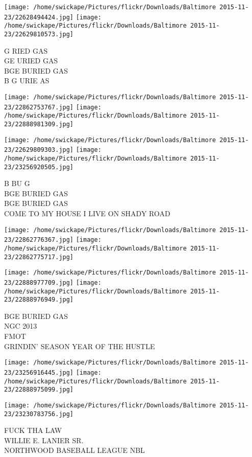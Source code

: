 \documentclass[10pt,letterpaper]{article}
\begin{document}
\texttt{[image: /home/swickape/Pictures/flickr/Downloads/Baltimore 2015-11-23/22628494424.jpg]}
\texttt{[image: /home/swickape/Pictures/flickr/Downloads/Baltimore 2015-11-23/22629810573.jpg]}

G RIED GAS\\
GE URIED GAS\\
BGE BURIED GAS\\
B G URIE AS
\pagebreak

\texttt{[image: /home/swickape/Pictures/flickr/Downloads/Baltimore 2015-11-23/22862753767.jpg]}
\texttt{[image: /home/swickape/Pictures/flickr/Downloads/Baltimore 2015-11-23/22888981309.jpg]}

\texttt{[image: /home/swickape/Pictures/flickr/Downloads/Baltimore 2015-11-23/22629809303.jpg]}
\texttt{[image: /home/swickape/Pictures/flickr/Downloads/Baltimore 2015-11-23/23256920505.jpg]}

B BU G\\
BGE BURIED GAS\\
BGE BURIED GAS\\
COME TO MY HOUSE I LIVE ON SHADY ROAD
\pagebreak

\texttt{[image: /home/swickape/Pictures/flickr/Downloads/Baltimore 2015-11-23/22862776367.jpg]}
\texttt{[image: /home/swickape/Pictures/flickr/Downloads/Baltimore 2015-11-23/22862775717.jpg]}

\texttt{[image: /home/swickape/Pictures/flickr/Downloads/Baltimore 2015-11-23/22888977709.jpg]}
\texttt{[image: /home/swickape/Pictures/flickr/Downloads/Baltimore 2015-11-23/22888976949.jpg]}

BGE BURIED GAS\\
NGC 2013\\
FMOT\\
GRINDIN' SEASON YEAR OF THE HUSTLE
\pagebreak

\texttt{[image: /home/swickape/Pictures/flickr/Downloads/Baltimore 2015-11-23/23256916445.jpg]}
\texttt{[image: /home/swickape/Pictures/flickr/Downloads/Baltimore 2015-11-23/22888975099.jpg]}

\vspace{0.25in}
\texttt{[image: /home/swickape/Pictures/flickr/Downloads/Baltimore 2015-11-23/23230783756.jpg]}

FUCK THA LAW\\
WILLIE E. LANIER SR.\\
NORTHWOOD BASEBALL LEAGUE NBL
\pagebreak
\end{document}
